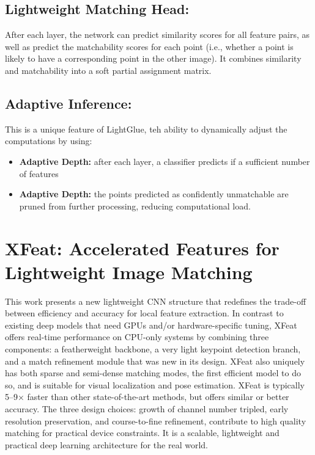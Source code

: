\subsection{Lightweight Matching Head:}
After each layer, the network can predict similarity scores for all feature
pairs, as well as predict the matchability scores for each point (i.e., whether
a point is likely to have a corresponding point in the other image). It
combines similarity and matchability into a soft partial assignment matrix.
\subsection{Adaptive Inference:}
This is a unique feature of LightGlue, teh ability to dynamically adjust the
computations by using:
\begin{itemize}
    \item \textbf{Adaptive Depth: }after each layer, a classifier predicts if a sufficient number of features
    \item \textbf{Adaptive Depth:} the points predicted as confidently unmatchable are pruned from further processing, reducing computational load.
\end{itemize}
\section{XFeat: Accelerated Features for Lightweight Image Matching}
This work presents a new lightweight CNN structure that redefines the trade-off
between efficiency and accuracy for local feature extraction. In contrast to
existing deep models that need GPUs and/or hardware-specific tuning, XFeat
offers real-time performance on CPU-only systems by combining three components:
a featherweight backbone, a very light keypoint detection branch, and a match
refinement module that was new in its design. XFeat also uniquely has both
sparse and semi-dense matching modes, the first efficient model to do so, and
is suitable for visual localization and pose estimation. XFeat is typically
5–9× faster than other state-of-the-art methods, but offers similar or better
accuracy. The three design choices: growth of channel number tripled, early
resolution preservation, and course-to-fine refinement, contribute to high
quality matching for practical device constraints. It is a scalable,
lightweight and practical deep learning architecture for the real world.
